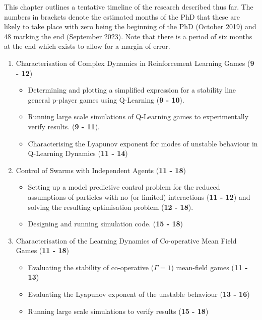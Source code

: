 \documentclass[.../main.tex]{subfiles}
\begin{document}
    
	This chapter outlines a tentative timeline of the research
        described thus far. The numbers in brackets denote the
        estimated months of the PhD that these are likely to take
        place with zero being the beginning of the PhD (October 2019)
        and 48 marking the end (September 2023). Note that there is a
        period of six months at the end which exists to allow for a
        margin of error.



	\begin{enumerate}
		\item Characterisation of Complex Dynamics in Reinforcement Learning Games (\textbf{9 - 12})
		\begin{itemize}
			\item Determining and plotting a simplified expression for a stability line general
			p-player games using Q-Learning (\textbf{9 - 10}).
			\item Running large scale simulations of Q-Learning games to experimentally verify
			results. (\textbf{9 - 11}).
			\item Characterising the Lyapunov exponent for modes of unstable behaviour in Q-Learning
			Dynamics (\textbf{11 - 14})
		\end{itemize}

		\item Control of Swarms with Independent Agents (\textbf{11 - 18})
		\begin{itemize}
			\item Setting up a model predictive control problem for the reduced assumptions of
			particles with no (or limited) interactions (\textbf{11 - 12}) and solving the resulting
			optimisation problem (\textbf{12 - 18}). 
			\item Designing and running simulation code. (\textbf{15 - 18})
		\end{itemize}

		\item Characterisation of the Learning Dynamics of Co-operative Mean Field Games (\textbf{11
				- 18})
		\begin{itemize}
			\item Evaluating the stability of co-operative ($\Gamma = 1$) mean-field games (\textbf{11 - 13})
			\item Evaluating the Lyapunov exponent of the unstable behaviour (\textbf{13 - 16})
			\item Running large scale simulations to verify results (\textbf{15 - 18})
		\end{itemize}


\end{enumerate}
\end{document}
